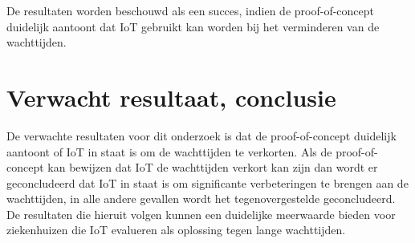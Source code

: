 De resultaten worden beschouwd als een succes, indien de proof-of-concept duidelijk aantoont dat IoT gebruikt kan worden bij het verminderen van de wachttijden.




\section{Verwacht resultaat, conclusie}%
\label{sec:verwachte_resultaten}




De verwachte resultaten voor dit onderzoek is dat de proof-of-concept duidelijk aantoont of IoT in staat is om de wachttijden te verkorten. Als de proof-of-concept kan bewijzen dat IoT de wachttijden verkort kan zijn dan wordt er geconcludeerd dat IoT in staat is om significante verbeteringen te brengen aan de wachttijden, in alle andere gevallen wordt het tegenovergestelde geconcludeerd. De resultaten die hieruit volgen kunnen een duidelijke meerwaarde bieden voor ziekenhuizen die IoT evalueren als oplossing tegen lange wachttijden.
